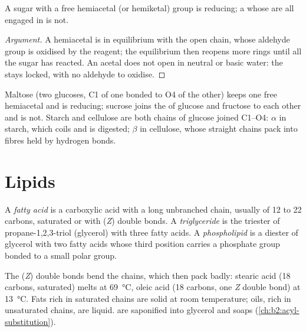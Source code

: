 \begin{proposition}\label{prop:b2:biomolecules:reducing}
A sugar with a free hemiacetal (or hemiketal) group is reducing; a  whose  are
all engaged in  is not.
\end{proposition}

\begin{proof}[Argument]
A hemiacetal is in equilibrium with the open chain, whose aldehyde group is oxidised by the reagent;
the equilibrium then reopens more rings until all the sugar has reacted. An acetal does not open in
neutral or basic water: the  stays locked, with no aldehyde to oxidise.
\end{proof}

Maltose (two glucoses, C1 of one bonded to O4 of the other) keeps one free hemiacetal and is reducing;
sucrose joins the  of glucose and fructose to each other and is not. Starch and
cellulose are both chains of glucose joined C1--O4: $\alpha$ in starch, which coils and is digested;
$\beta$ in cellulose, whose straight chains pack into fibres held by hydrogen bonds.

\section{Lipids}

\begin{definition}[Lipids]\label{def:b2:biomolecules:lipid}
A \emph{fatty acid} is a carboxylic acid with a long unbranched chain, usually of 12 to
22 carbons, saturated or with (\textit{Z}) double bonds. A \emph{triglyceride} is the
triester of propane-1,2,3-triol (glycerol) with three fatty acids. A
\emph{phospholipid} is a diester of glycerol with two fatty acids whose third
position carries a phosphate group bonded to a small polar group.
\end{definition}

The (\textit{Z}) double bonds bend the chains, which then pack badly: stearic acid (18 carbons,
saturated) melts at \qty{69}{\degreeCelsius}, oleic acid (18 carbons, one \textit{Z} double bond) at
\qty{13}{\degreeCelsius}. Fats rich in saturated chains are solid at room temperature; oils, rich in
unsaturated chains, are liquid.  are saponified into glycerol and soaps
(\cref{ch:b2:acyl-substitution}).

